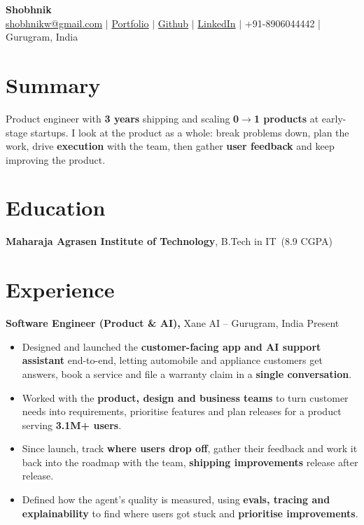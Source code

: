 \documentclass[10pt,a4paper]{article}
\newcommand{\resumeheader}[6]{%
    {\centering
        {\Large \textbf{#1}}\\[4pt]
        \href{mailto:#2}{#2} $|$
        \href{#3}{Portfolio} $|$
        \href{#4}{Github} $|$
        \href{#5}{LinkedIn} $|$
        #6\par}
}
\newcommand{\education}[4]{%
    \textbf{#1}, #2\ (#3) \hfill #4
}
\newcommand{\experience}[4]{%
    \textbf{#1,} #2 -- #3 \hfill #4
}
\begin{document}
\resumeheader{Shobhnik}
{shobhnikw@gmail.com}
{https://shobhnik.xyz}
{https://github.com/shobhnik13}
{https://www.linkedin.com/in/shobhnik13/}
{+91-8906044442 | Gurugram, India}

\section{Summary}
Product engineer with \textbf{3 years} shipping and scaling \textbf{0$\rightarrow$1 products} at early-stage startups. I look at the product as a whole: break problems down, plan the work, drive \textbf{execution} with the team, then gather \textbf{user feedback} and keep improving the product.

\section{Education}
\education{Maharaja Agrasen Institute of Technology}{B.Tech in IT}{8.9 CGPA}{}

\section{Experience}

\experience{Software Engineer (Product \& AI)}{Xane AI}{Gurugram, India}{Present}
\begin{itemize}[leftmargin=20pt]
\item Designed and launched the \textbf{customer-facing app and AI support assistant} end-to-end, letting automobile and appliance customers get answers, book a service and file a warranty claim in a \textbf{single conversation}.
\item Worked with the \textbf{product, design and business teams} to turn customer needs into requirements, prioritise features and plan releases for a product serving \textbf{3.1M+ users}.
\item Since launch, track \textbf{where users drop off}, gather their feedback and work it back into the roadmap with the team, \textbf{shipping improvements} release after release.
\item Defined how the agent's quality is measured, using \textbf{evals, tracing and explainability} to find where users got stuck and \textbf{prioritise improvements}.
\end{itemize}
\end{document}
